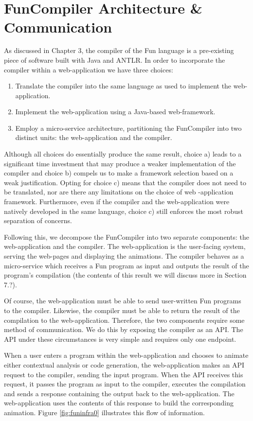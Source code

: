 \documentclass{l4proj}
\begin{document}
\section{FunCompiler Architecture \& Communication}
As discussed in Chapter 3, the compiler of the Fun language is a pre-existing piece of software built with Java and ANTLR. In order to incorporate the compiler within a web-application we have three choices:
\begin{enumerate}[label=\alph*)]
\item Translate the compiler into the same language as used to implement the web-application. 
\item Implement the web-application using a Java-based web-framework.
\item Employ a micro-service architecture, partitioning the FunCompiler into two distinct units: the web-application and the compiler.
\end{enumerate}
Although all choices do essentially produce the same result, choice a) leads to a significant time investment that may produce a weaker implementation of the compiler and choice b) compels us to make a framework selection based on a weak justification. Opting for choice c) means that the compiler does not need to be translated, nor are there any limitations on the choice of web -application framework. Furthermore, even if the compiler and the web-application were natively developed in the same language, choice c) still enforces the most robust separation of concerns.

Following this, we decompose the FunCompiler into two separate components: the web-application and the compiler. The web-application is the user-facing system, serving the web-pages and displaying the animations. The compiler behaves as a micro-service which receives a Fun program as input and outputs the result of the program's compilation (the contents of this result we will discuss more in Section 7.?). 

Of course, the web-application must be able to send user-written Fun programs to the compiler. Likewise, the compiler must be able to return the result of the compilation to the web-application. Therefore, the two components require some method of communication. We do this by exposing the compiler as an API. The API under these circumstances is very simple and requires only one endpoint. 

When a user enters a program within the web-application and chooses to animate either contextual analysis or code generation, the web-application makes an API request to the compiler, sending the input program. When the API receives this request, it passes the program as input to the compiler, executes the compilation and sends a response containing the output back to the web-application. The web-application uses the contents of this response to build the corresponding animation. Figure \ref{fig:funinfra0} illustrates this flow of information.
\end{document}
